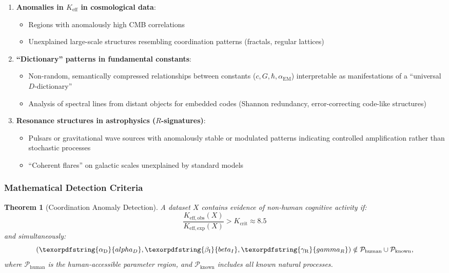 \documentclass[12pt,a4paper]{article}
\newtheorem{theorem}{Theorem}
\DeclareRobustCommand{\alD}{\texorpdfstring{\ensuremath{\alpha_{\mathrm{D}}}}{alpha_D}}
\DeclareRobustCommand{\beI}{\texorpdfstring{\ensuremath{\beta_{\mathrm{I}}}}{beta_I}}
\DeclareRobustCommand{\gaR}{\texorpdfstring{\ensuremath{\gamma_{\mathrm{R}}}}{gamma_R}}
\newcommand{\Ke}{K_{\mathrm{eff}}}
\newcommand{\Keobs}{K_{\mathrm{eff},\mathrm{obs}}}
\newcommand{\Keexp}{K_{\mathrm{eff},\mathrm{exp}}}
\newcommand{\Kcrit}{K_{\mathrm{crit}}}
\begin{document}
	\begin{enumerate}
		\item \textbf{Anomalies in \(\Ke\) in cosmological data}:
		\begin{itemize}
			\item Regions with anomalously high CMB correlations
			\item Unexplained large-scale structures resembling coordination patterns (fractals, regular lattices)
		\end{itemize}
		
		\item \textbf{``Dictionary'' patterns in fundamental constants}:
		\begin{itemize}
			\item Non-random, semantically compressed relationships between constants (\(c, G, \hbar, \alpha_{\mathrm{EM}}\)) interpretable as manifestations of a ``universal \(D\)-dictionary''
			\item Analysis of spectral lines from distant objects for embedded codes (Shannon redundancy, error-correcting code-like structures)
		\end{itemize}
		
		\item \textbf{Resonance structures in astrophysics (\(R\)-signatures)}:
		\begin{itemize}
			\item Pulsars or gravitational wave sources with anomalously stable or modulated patterns indicating controlled amplification rather than stochastic processes
			\item ``Coherent flares'' on galactic scales unexplained by standard models
		\end{itemize}
	\end{enumerate}
	
	\subsubsection{Mathematical Detection Criteria}
	
	\begin{theorem}[Coordination Anomaly Detection]
		A dataset \(X\) contains evidence of non-human cognitive activity if:
		\[
		\frac{\Keobs(X)}{\Keexp(X)} > \Kcrit \approx 8.5
		\]
		and simultaneously:
		\[
		(\alD, \beI, \gaR) \notin \mathcal{P}_{\mathrm{human}} \cup \mathcal{P}_{\mathrm{known}},
		\]
		where \(\mathcal{P}_{\mathrm{human}}\) is the human-accessible parameter region, and \(\mathcal{P}_{\mathrm{known}}\) includes all known natural processes.
	\end{theorem}
	
\end{document}

